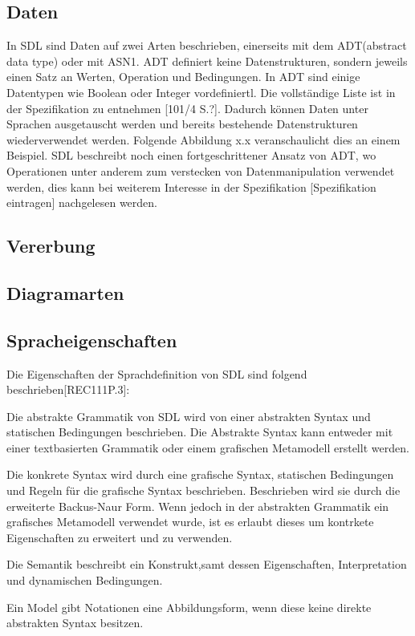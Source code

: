 \subsection{Daten}
\label{ssc:Daten}
In \ac{SDL} sind Daten auf zwei Arten beschrieben, einerseits mit dem \ac{ADT}(abstract data type) oder mit \ac{ASN1}. \ac{ADT} definiert keine 
Datenstrukturen, sondern jeweils einen Satz an Werten, Operation und Bedingungen. In \ac{ADT} sind einige Datentypen wie Boolean oder Integer vordefiniertl. Die vollständige Liste ist in der Spezifikation zu entnehmen [101/4 S.?].  Dadurch können Daten unter Sprachen ausgetauscht werden und bereits bestehende Datenstrukturen wiederverwendet werden. Folgende 
Abbildung x.x veranschaulicht dies an einem Beispiel. \ac{SDL} beschreibt noch einen 
fortgeschrittener Ansatz von \ac{ADT}, wo Operationen unter anderem zum verstecken von 
Datenmanipulation verwendet werden, dies kann bei weiterem Interesse in der Spezifikation 
[Spezifikation eintragen] nachgelesen werden.    
\subsection{Vererbung} 
\label{ssc:Vererbung}


\subsection{Diagramarten}
\label{ssc:Diagramarten}

\subsection{Spracheigenschaften}
\label{ssc:Spracheigenschaften}
Die Eigenschaften der Sprachdefinition von \ac{SDL} sind folgend beschrieben[REC111P.3]:
\begin{itemize}{
		\item[Abstrakte Grammatik] Die abstrakte Grammatik von \ac{SDL} wird von einer abstrakten Syntax und  statischen Bedingungen 
		beschrieben. Die Abstrakte Syntax kann entweder mit einer textbasierten Grammatik oder einem grafischen Metamodell erstellt werden.
		
		\item[Konkrete Grammatik] Die konkrete Syntax wird durch eine grafische Syntax, statischen Bedingungen und Regeln für die grafische Syntax beschrieben.
		Beschrieben wird sie durch die erweiterte Backus-Naur Form. Wenn jedoch in der abstrakten Grammatik ein 
		grafisches Metamodell verwendet wurde, ist es erlaubt dieses um kontrkete Eigenschaften zu erweitert und zu verwenden.
		
		\item[Semantik] Die Semantik beschreibt ein Konstrukt,samt dessen Eigenschaften, Interpretation und dynamischen Bedingungen.
		
		\item[Model] Ein Model gibt Notationen eine Abbildungsform, wenn diese keine direkte abstrakten Syntax besitzen.
}\end{itemize}

